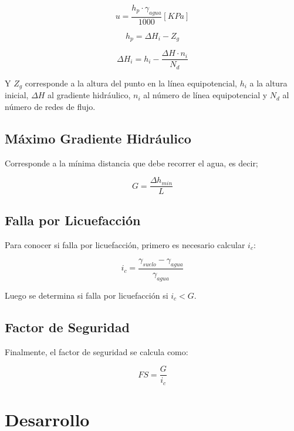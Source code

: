 \begin{equation}
  u = \frac{h_p \cdot \gamma_{agua}}{1000} [KPa]
\end{equation}

\begin{equation}
  h_p = \Delta H_i - Z_g
\end{equation}

\begin{equation}
  \Delta H_i = h_i - \frac{\Delta H \cdot n_i}{N_d}
\end{equation}

Y $Z_g$ corresponde a la altura del punto en la línea equipotencial, $h_i$ a la altura inicial, $\Delta H$ al gradiente hidráulico, $n_i$ al número de línea equipotencial y $N_d$ al número de redes de flujo.

\subsection{Máximo Gradiente Hidráulico}

Corresponde a la mínima distancia que debe recorrer el agua, es decir;

\begin{equation}
  G = \frac{\Delta h_{min}}{L}
\end{equation}

\subsection{Falla por Licuefacción}

Para conocer si falla por licuefacción, primero es necesario calcular $i_c$:

\begin{equation}
  i_c = \frac{\gamma_{suelo} - \gamma_{agua}}{\gamma_{agua}}
\end{equation}

Luego se determina si falla por licuefacción si $i_c < G$.

\subsection{Factor de Seguridad}

Finalmente, el factor de seguridad se calcula como:

\begin{equation}
  FS = \frac{G}{i_c}
\end{equation}

\section{Desarrollo}

